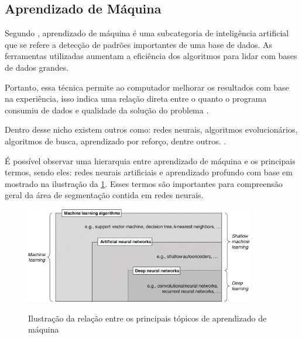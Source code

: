 \subsection{Aprendizado de Máquina}

Segundo , aprendizado de máquina é uma subcategoria de inteligência artificial que se refere  a detecção de padrões importantes de uma base de dados. As ferramentas utilizadas aumentam a eficiência dos algoritmos para lidar com bases de dados grandes.

Portanto, essa técnica permite ao computador melhorar os resultados com base na experiência, isso indica uma relação direta entre o quanto o programa consumiu de dados e qualidade da solução do problema \cite{ml_explicado}. 

Dentro desse nicho existem outros como: redes neurais, algoritmos evolucionários, algoritmos de busca, aprendizado por reforço, dentre outros. \cite{ml_oil_gas_industry}.

É possível observar uma hierarquia entre aprendizado de máquina e os principais termos, sendo eles: redes neurais artificiais e aprendizado profundo com base em  mostrado na ilustração da \cref{fig:diagrama_ann}. Esses termos são importantes para compreensão geral da área de segmentação contida em redes neurais.

\begin{figure}[ht]
	\caption{Ilustração da relação entre os principais tópicos de aprendizado de máquina}
	\centering %
	\includegraphics[width=10cm]{figures/diagrama_ann.jpg} %
	\label{fig:diagrama_ann}
\end{figure}
